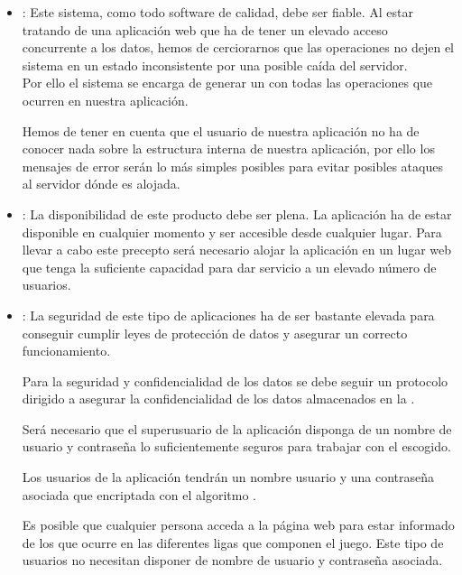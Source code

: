 \begin{itemize}
  \item {}: Este sistema, como todo software de
    calidad, debe ser fiable. Al estar tratando de una aplicación web
    que ha de tener un elevado acceso concurrente a los datos, hemos
    de cerciorarnos que las operaciones no dejen el sistema en un
    estado inconsistente por una posible caída del servidor.\\

    Por ello el sistema se encarga de generar un  con
    todas las operaciones que ocurren en nuestra aplicación.

    Hemos de tener en cuenta que el usuario de nuestra aplicación no
    ha de conocer nada sobre la estructura interna de nuestra
    aplicación, por ello los mensajes de error serán lo más simples
    posibles para evitar posibles ataques al servidor dónde es
    alojada.

    \item {}: La disponibilidad de este producto
      debe ser plena. La aplicación ha de estar disponible en
      cualquier momento y ser accesible desde cualquier lugar. Para
      llevar a cabo este precepto será necesario alojar la aplicación
      en un lugar web que tenga la suficiente capacidad para dar
      servicio a un elevado número de usuarios.

   \item {}: La seguridad de este tipo de
     aplicaciones ha de ser bastante elevada para conseguir cumplir
     leyes de protección de datos y asegurar un correcto
     funcionamiento.

     Para la seguridad y confidencialidad de los datos se debe seguir
     un protocolo dirigido a asegurar la confidencialidad de los datos
     almacenados en la .

     Será necesario que el superusuario de la aplicación disponga de
     un nombre de usuario y contraseña lo suficientemente seguros para
     trabajar con el  escogido.

     Los usuarios de la aplicación tendrán un nombre usuario y una
     contraseña asociada que encriptada con el algoritmo
     .

     Es posible que cualquier persona acceda a la página web para
     estar informado de los que ocurre en las diferentes ligas que
     componen el juego. Este tipo de usuarios no necesitan disponer de
     nombre de usuario y contraseña asociada.


\end{itemize}
